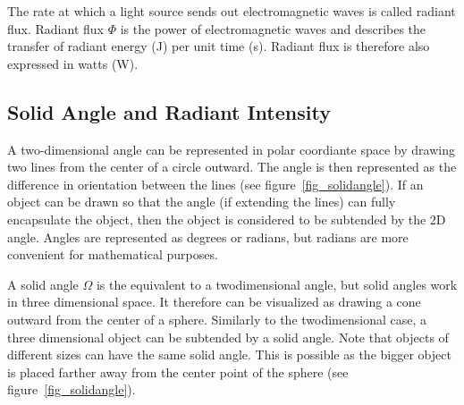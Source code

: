 \documentclass[11pt,a4paper]{report}
\begin{document}
The rate at which a light source sends out electromagnetic waves is called radiant flux. Radiant flux $\Phi$ is the power of electromagnetic waves and describes the transfer of radiant energy (J) per unit time (s). Radiant flux is therefore also expressed in watts (W).

\subsection{Solid Angle and Radiant Intensity}

A two-dimensional angle can be represented in polar coordiante space by drawing two lines from the center of a circle outward. The angle is then represented as the difference in orientation between the lines (see figure~\ref{fig_solidangle}). If an object can be drawn so that the angle (if extending the lines) can fully encapsulate the object, then the object is considered to be subtended by the 2D angle. Angles are represented as degrees or radians, but radians are more convenient for mathematical purposes. 

A solid angle $\Omega$ is the equivalent to a twodimensional angle, but solid angles work in three dimensional space. It therefore can be visualized as drawing a cone outward from the center of a sphere. Similarly to the twodimensional case, a three dimensional object can be subtended by a solid angle. Note that objects of different sizes can have the same solid angle. This is possible as the bigger object is placed farther away from the center point of the sphere (see figure~\ref{fig_solidangle}).
\end{document}
